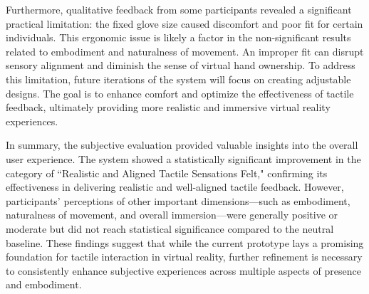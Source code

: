 Furthermore, qualitative feedback from some participants revealed a significant practical limitation: the fixed glove size caused discomfort and poor fit for certain individuals. This ergonomic issue is likely a factor in the non-significant results related to embodiment and naturalness of movement. An improper fit can disrupt sensory alignment and diminish the sense of virtual hand ownership. To address this limitation, future iterations of the system will focus on creating adjustable designs. The goal is to enhance comfort and optimize the effectiveness of tactile feedback, ultimately providing more realistic and immersive virtual reality experiences.

In summary, the subjective evaluation provided valuable insights into the overall user experience. The system showed a statistically significant improvement in the category of ``Realistic and Aligned Tactile Sensations Felt," confirming its effectiveness in delivering realistic and well-aligned tactile feedback. However, participants' perceptions of other important dimensions—such as embodiment, naturalness of movement, and overall immersion—were generally positive or moderate but did not reach statistical significance compared to the neutral baseline. These findings suggest that while the current prototype lays a promising foundation for tactile interaction in virtual reality, further refinement is necessary to consistently enhance subjective experiences across multiple aspects of presence and embodiment.




